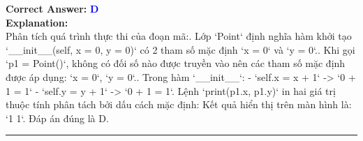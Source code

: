 \documentclass[11pt,a4paper]{article}
\begin{document}
\begin{minipage}{\textwidth}
\noindent \textbf{Correct Answer:} \textcolor{blue}{\textbf{D}} \\[4pt]
\noindent \textbf{Explanation:}\\
Phân tích quá trình thực thi của đoạn mã:. Lớp `Point` định nghĩa hàm khởi tạo `__init__(self, x = 0, y = 0)` có 2 tham số mặc định `x = 0` và `y = 0`.. Khi gọi `p1 = Point()`, không có đối số nào được truyền vào nên các tham số mặc định được áp dụng: `x = 0`, `y = 0`.. Trong hàm `__init__`:\newline
   - `self.x = x + 1` -> `0 + 1 = 1`\newline
   - `self.y = y + 1` -> `0 + 1 = 1`. Lệnh `print(p1.x, p1.y)` in hai giá trị thuộc tính phân tách bởi dấu cách mặc định:\newline
   Kết quả hiển thị trên màn hình là: `1 1`.\newline
Đáp án đúng là D.
\end{minipage}
\vspace{0.8cm}
\hrule
\vspace{0.5cm}
\end{document}
